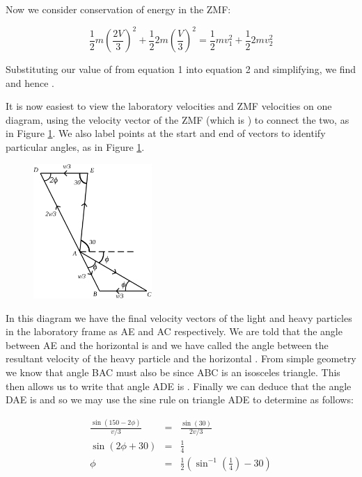 \begin{problem}
{\begin{enumerate}
Now we consider conservation of energy in the ZMF:

\begin{equation}
\frac{1}{2}m\left(\frac{2V}{3}\right)^2+\frac{1}{2}2m\left(\frac{V}{3}\right)^2=\frac{1}{2}mv_1^2+\frac{1}{2}2mv_2^2
\end{equation}

Substituting our value of  from equation 1 into equation 2 and simplifying, we find  and hence . 

It is now easiest to view the laboratory velocities and ZMF velocities on one diagram, using the velocity vector of the ZMF (which is ) to connect the two, as in Figure \ref{fig:Tripos_Inelastic_ZMF_3}. We also label points at the start and end of vectors to identify particular angles, as in Figure \ref{fig:Tripos_Inelastic_ZMF_3}. 


\begin{figure}[h]
	\centering
	\includegraphics[width=0.4\textwidth]{../../../figures/Tripos_Inelastic_ZMF_3.svg}
	\caption{}\label{fig:Tripos_Inelastic_ZMF_3}
\end{figure}

In this diagram we have the final velocity vectors of the light and heavy particles in the laboratory frame as AE and AC respectively. We are told that the angle between AE and the horizontal is  and we have called the angle between the resultant velocity of the heavy particle and the horizontal \vari{\phi}. From simple geometry we know that angle BAC must also be \vari{\phi} since ABC is an isosceles triangle. This then allows us to write that angle ADE is \vari{2\phi}. Finally we can deduce that the angle DAE is  and so we may use the sine rule on triangle ADE to determine \vari{\phi} as follows:

\begin{eqnarray*}
\frac{\sin{(150-2\phi)}}{v/3} &=& \frac{\sin{(30)}}{2v/3} \\
\sin{(2\phi+30)} &=& \frac{1}{4} \\
\phi &=& \frac{1}{2}(\sin^{-1}{(\frac{1}{4})}-30)
\end{eqnarray*}


\end{enumerate}}
\end{problem}
